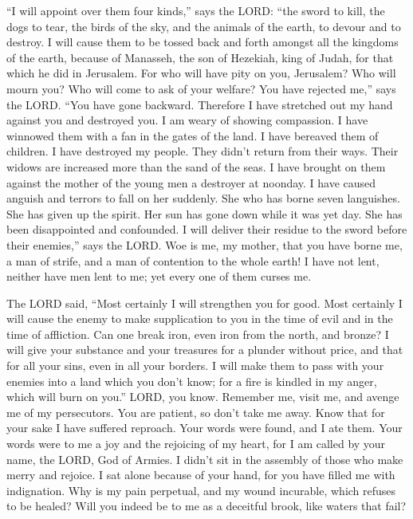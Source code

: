  ``I will appoint over them four kinds,'' says the LORD:
``the sword to kill, the dogs to tear, the birds of the sky, and the
animals of the earth, to devour and to destroy.  I will
cause them to be tossed back and forth amongst all the kingdoms of the
earth, because of Manasseh, the son of Hezekiah, king of Judah, for that
which he did in Jerusalem.  For who will have pity on you,
Jerusalem? Who will mourn you? Who will come to ask of your welfare?
 You have rejected me,'' says the LORD. ``You have gone
backward. Therefore I have stretched out my hand against you and
destroyed you. I am weary of showing compassion.  I have
winnowed them with a fan in the gates of the land. I have bereaved them
of children. I have destroyed my people. They didn't return from their
ways.  Their widows are increased more than the sand of
the seas. I have brought on them against the mother of the young men a
destroyer at noonday. I have caused anguish and terrors to fall on her
suddenly.  She who has borne seven languishes. She has
given up the spirit. Her sun has gone down while it was yet day. She has
been disappointed and confounded. I will deliver their residue to the
sword before their enemies,'' says the LORD.  Woe is me,
my mother, that you have borne me, a man of strife, and a man of
contention to the whole earth! I have not lent, neither have men lent to
me; yet every one of them curses me.

 The LORD said, ``Most certainly I will strengthen you
for good. Most certainly I will cause the enemy to make supplication to
you in the time of evil and in the time of affliction. 
Can one break iron, even iron from the north, and bronze?
 I will give your substance and your treasures for a
plunder without price, and that for all your sins, even in all your
borders.  I will make them to pass with your enemies into
a land which you don't know; for a fire is kindled in my anger, which
will burn on you.''  LORD, you know. Remember me, visit
me, and avenge me of my persecutors. You are patient, so don't take me
away. Know that for your sake I have suffered reproach. 
Your words were found, and I ate them. Your words were to me a joy and
the rejoicing of my heart, for I am called by your name, the LORD, God
of Armies.  I didn't sit in the assembly of those who
make merry and rejoice. I sat alone because of your hand, for you have
filled me with indignation.  Why is my pain perpetual,
and my wound incurable, which refuses to be healed? Will you indeed be
to me as a deceitful brook, like waters that fail?

